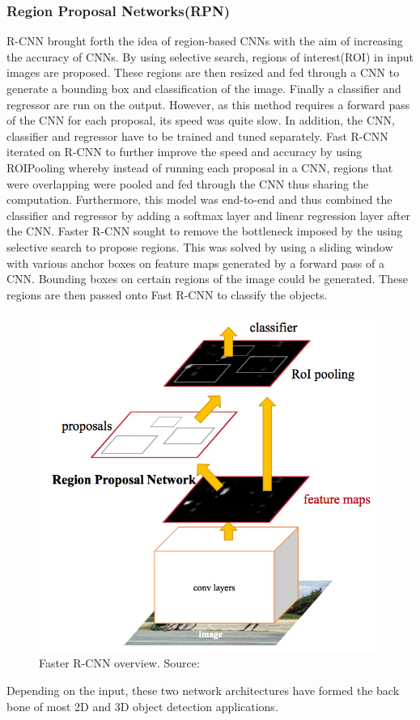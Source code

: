 \subsubsection*{Region Proposal Networks(RPN)}
R-CNN\cite{girshick2014rich} brought forth the idea of region-based CNNs with the aim of increasing the accuracy of CNNs. By using selective search, regions of interest(ROI) in input images are proposed. These regions are then resized and fed through a CNN to generate a bounding box and classification of the image. Finally a classifier and regressor are run on the output. However, as this method requires a forward pass of the CNN for each proposal, its speed was quite slow. In addition, the CNN, classifier and regressor have to be trained and tuned separately. 
Fast R-CNN\cite{girshickICCV15fastrcnn} iterated on R-CNN to further improve the speed and accuracy by using ROIPooling whereby instead of running each proposal in a CNN, regions that were overlapping were pooled and fed through the CNN thus sharing the computation. Furthermore, this model was end-to-end and thus combined the classifier and regressor  by adding a softmax layer and linear regression layer after the CNN.
Faster R-CNN\cite{ren2015faster} sought to remove the bottleneck imposed by the using selective search to propose regions. This was solved by using a sliding window with various anchor boxes on feature maps generated by a forward pass of a CNN. Bounding boxes on certain regions of the image could be generated. These regions are then passed onto Fast R-CNN to classify the objects. 
\begin{figure}[h]
	\centering
	\includegraphics[width=0.5\linewidth]{images/fastercnn}
	\caption{Faster R-CNN overview. Source:\cite{ren2015faster}}
\end{figure}


Depending on the input, these two network architectures have formed the back bone of most 2D and 3D object detection applications. 
